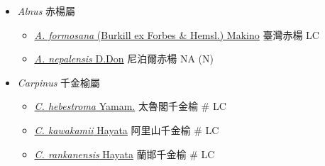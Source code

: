 
  \begin{itemize}
 \item[] \textit{Alnus} 赤楊屬
                                
  \begin{itemize}
        \item[] \href{http://www.theplantlist.org/tpl1.1/search?q=Alnus+formosana}{\textit{A. formosana} (Burkill ex Forbes \& Hemsl.) Makino}   臺灣赤楊   LC
        \item[] \href{http://www.theplantlist.org/tpl1.1/search?q=Alnus+nepalensis}{\textit{A. nepalensis} D.Don}   尼泊爾赤楊   NA (N)
  \end{itemize}
 \item[] \textit{Carpinus} 千金榆屬
                                
  \begin{itemize}
        \item[] \href{http://www.theplantlist.org/tpl1.1/search?q=Carpinus+hebestroma}{\textit{C. hebestroma} Yamam.}   太魯閣千金榆  \# LC
        \item[] \href{http://www.theplantlist.org/tpl1.1/search?q=Carpinus+kawakamii}{\textit{C. kawakamii} Hayata}   阿里山千金榆  \# LC
        \item[] \href{http://www.theplantlist.org/tpl1.1/search?q=Carpinus+rankanensis}{\textit{C. rankanensis} Hayata}   蘭邯千金榆  \# LC
  \end{itemize}
  \end{itemize}
